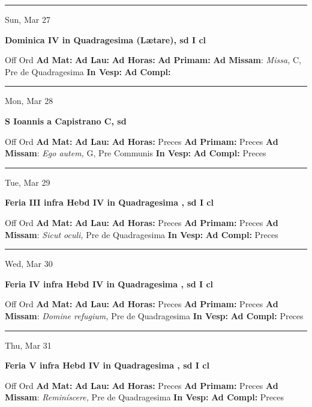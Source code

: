 \documentclass[letterpaper, 10pt]{article}
\begin{document}
\hrule
\begin{center}
Sun, Mar 27
\end{center}\textbf{ \large Dominica IV in Quadragesima (Lætare), \textnormal{\normalsize sd I cl}}
\begin{justify}
Off Ord
\textbf{Ad Mat: }
\textbf{Ad Lau: }
\textbf{Ad Horas: }
\textbf{Ad Primam: }
\textbf{Ad Missam}: \textit{Missa,} C, Pre de Quadragesima
\textbf{In Vesp: }
\textbf{Ad Compl: }\end{justify}



\hrule
\begin{center}
Mon, Mar 28
\end{center}\textbf{ \large S Ioannis a Capistrano C, \textnormal{\normalsize sd}}
\begin{justify}
Off Ord
\textbf{Ad Mat: }
\textbf{Ad Lau: }
\textbf{Ad Horas: }Preces
\textbf{Ad Primam: }Preces
\textbf{Ad Missam}: \textit{Ego autem,} G, Pre Communis
\textbf{In Vesp: }
\textbf{Ad Compl: }Preces\end{justify}



\hrule
\begin{center}
Tue, Mar 29
\end{center}\textbf{ \large Feria III infra Hebd IV in Quadragesima , \textnormal{\normalsize sd I cl}}
\begin{justify}
Off Ord
\textbf{Ad Mat: }
\textbf{Ad Lau: }
\textbf{Ad Horas: }Preces
\textbf{Ad Primam: }Preces
\textbf{Ad Missam}: \textit{Sicut oculi,} Pre de Quadragesima
\textbf{In Vesp: }
\textbf{Ad Compl: }Preces\end{justify}



\hrule
\begin{center}
Wed, Mar 30
\end{center}\textbf{ \large Feria IV infra Hebd IV in Quadragesima , \textnormal{\normalsize sd I cl}}
\begin{justify}
Off Ord
\textbf{Ad Mat: }
\textbf{Ad Lau: }
\textbf{Ad Horas: }Preces
\textbf{Ad Primam: }Preces
\textbf{Ad Missam}: \textit{Domine refugium,} Pre de Quadragesima
\textbf{In Vesp: }
\textbf{Ad Compl: }Preces\end{justify}



\hrule
\begin{center}
Thu, Mar 31
\end{center}\textbf{ \large Feria V infra Hebd IV in Quadragesima , \textnormal{\normalsize sd I cl}}
\begin{justify}
Off Ord
\textbf{Ad Mat: }
\textbf{Ad Lau: }
\textbf{Ad Horas: }Preces
\textbf{Ad Primam: }Preces
\textbf{Ad Missam}: \textit{Reminíscere,} Pre de Quadragesima
\textbf{In Vesp: }
\textbf{Ad Compl: }Preces\end{justify}
\end{document}
